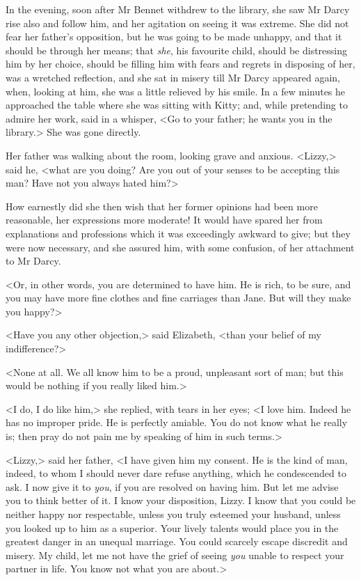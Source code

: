 In the evening, soon after Mr Bennet withdrew to the library, she saw Mr Darcy rise also and follow him, and her agitation on seeing it was extreme. She did not fear her father's opposition, but he was going to be made unhappy, and that it should be through her means; that \textit{she}, his favourite child, should be distressing him by her choice, should be filling him with fears and regrets in disposing of her, was a wretched reflection, and she sat in misery till Mr Darcy appeared again, when, looking at him, she was a little relieved by his smile. In a few minutes he approached the table where she was sitting with Kitty; and, while pretending to admire her work, said in a whisper, <Go to your father; he wants you in the library.> She was gone directly.

Her father was walking about the room, looking grave and anxious. <Lizzy,> said he, <what are you doing? Are you out of your senses to be accepting this man? Have not you always hated him?>

How earnestly did she then wish that her former opinions had been more reasonable, her expressions more moderate! It would have spared her from explanations and professions which it was exceedingly awkward to give; but they were now necessary, and she assured him, with some confusion, of her attachment to Mr Darcy.

<Or, in other words, you are determined to have him. He is rich, to be sure, and you may have more fine clothes and fine carriages than Jane. But will they make you happy?>

<Have you any other objection,> said Elizabeth, <than your belief of my indifference?>

<None at all. We all know him to be a proud, unpleasant sort of man; but this would be nothing if you really liked him.>

<I do, I do like him,> she replied, with tears in her eyes; <I love him. Indeed he has no improper pride. He is perfectly amiable. You do not know what he really is; then pray do not pain me by speaking of him in such terms.>

<Lizzy,> said her father, <I have given him my consent. He is the kind of man, indeed, to whom I should never dare refuse anything, which he condescended to ask. I now give it to \textit{you}, if you are resolved on having him. But let me advise you to think better of it. I know your disposition, Lizzy. I know that you could be neither happy nor respectable, unless you truly esteemed your husband, unless you looked up to him as a superior. Your lively talents would place you in the greatest danger in an unequal marriage. You could scarcely escape discredit and misery. My child, let me not have the grief of seeing \textit{you} unable to respect your partner in life. You know not what you are about.>

